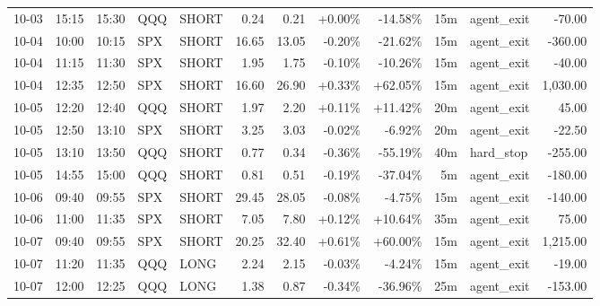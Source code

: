 \documentclass[11pt,a4paper]{article}
\begin{document}
\begin{center}
\begin{longtable}{>{\color{txtmain}}l l l l l r r r r r >{\color{txtmain}}l r}
10-03 & 15:15 & 15:30 & QQQ & SHORT & 0.24 & 0.21 & \textcolor{wingreen}{+0.00\%} & \textcolor{lossred}{-14.58\%} & 15m & agent\_exit & \textcolor{lossred}{-70.00} \\
10-04 & 10:00 & 10:15 & SPX & SHORT & 16.65 & 13.05 & \textcolor{lossred}{-0.20\%} & \textcolor{lossred}{-21.62\%} & 15m & agent\_exit & \textcolor{lossred}{-360.00} \\
10-04 & 11:15 & 11:30 & SPX & SHORT & 1.95 & 1.75 & \textcolor{lossred}{-0.10\%} & \textcolor{lossred}{-10.26\%} & 15m & agent\_exit & \textcolor{lossred}{-40.00} \\
10-04 & 12:35 & 12:50 & SPX & SHORT & 16.60 & 26.90 & \textcolor{wingreen}{+0.33\%} & \textcolor{wingreen}{+62.05\%} & 15m & agent\_exit & \textcolor{wingreen}{1,030.00} \\
10-05 & 12:20 & 12:40 & QQQ & SHORT & 1.97 & 2.20 & \textcolor{wingreen}{+0.11\%} & \textcolor{wingreen}{+11.42\%} & 20m & agent\_exit & \textcolor{wingreen}{45.00} \\
10-05 & 12:50 & 13:10 & SPX & SHORT & 3.25 & 3.03 & \textcolor{lossred}{-0.02\%} & \textcolor{lossred}{-6.92\%} & 20m & agent\_exit & \textcolor{lossred}{-22.50} \\
10-05 & 13:10 & 13:50 & QQQ & SHORT & 0.77 & 0.34 & \textcolor{lossred}{-0.36\%} & \textcolor{lossred}{-55.19\%} & 40m & hard\_stop & \textcolor{lossred}{-255.00} \\
10-05 & 14:55 & 15:00 & QQQ & SHORT & 0.81 & 0.51 & \textcolor{lossred}{-0.19\%} & \textcolor{lossred}{-37.04\%} & 5m & agent\_exit & \textcolor{lossred}{-180.00} \\
10-06 & 09:40 & 09:55 & SPX & SHORT & 29.45 & 28.05 & \textcolor{lossred}{-0.08\%} & \textcolor{lossred}{-4.75\%} & 15m & agent\_exit & \textcolor{lossred}{-140.00} \\
10-06 & 11:00 & 11:35 & SPX & SHORT & 7.05 & 7.80 & \textcolor{wingreen}{+0.12\%} & \textcolor{wingreen}{+10.64\%} & 35m & agent\_exit & \textcolor{wingreen}{75.00} \\
10-07 & 09:40 & 09:55 & SPX & SHORT & 20.25 & 32.40 & \textcolor{wingreen}{+0.61\%} & \textcolor{wingreen}{+60.00\%} & 15m & agent\_exit & \textcolor{wingreen}{1,215.00} \\
10-07 & 11:20 & 11:35 & QQQ & LONG & 2.24 & 2.15 & \textcolor{lossred}{-0.03\%} & \textcolor{lossred}{-4.24\%} & 15m & agent\_exit & \textcolor{lossred}{-19.00} \\
10-07 & 12:00 & 12:25 & QQQ & LONG & 1.38 & 0.87 & \textcolor{lossred}{-0.34\%} & \textcolor{lossred}{-36.96\%} & 25m & agent\_exit & \textcolor{lossred}{-153.00} \\

\end{longtable}
\end{center}
\end{document}
